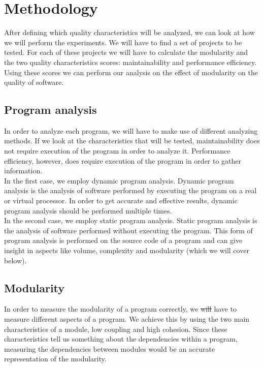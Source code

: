 \documentclass[twoside]{uva-inf-bachelor-thesis}
\begin{document}
\section{Methodology}
After defining which quality characteristics will be analyzed, we can look at how we will perform the experiments. We will have to find a set of projects to be tested. For each of these projects we will have to calculate the modularity and the two quality characteristics scores: maintainability and performance efficiency. Using these scores we can perform our analysis on the effect of modularity on the quality of software.

\subsection{Program analysis}
\label{method:analysis}
In order to analyze each program, we will have to make use of different analyzing methods. If we look at the characteristics that will be tested, maintainability does not require execution of the program in order to analyze it. Performance efficiency, however, does require execution of the program in order to gather information.\\

In the first case, we employ dynamic program analysis\cite{nielson2015principles}.
Dynamic program analysis is the analysis of software performed by executing the program on a real or virtual processor. In order to get accurate and effective results, dynamic program analysis should be performed multiple times.\\

In the second case, we employ static program analysis\cite{nielson2015principles}.
Static program analysis is the analysis of software performed without executing the program. This form of program analysis is performed on the source code of a program and can give insight in aspects like volume, complexity and modularity (which we will cover below).

\subsection{Modularity}
In order to measure the modularity of a program correctly, we \sout{will} have to measure different aspects of a program. We achieve this by using the two main characteristics of a module, low coupling and high cohesion. Since these characteristics tell us something about the dependencies within a program, measuring the dependencies between modules would be an accurate representation of the modularity.  
\end{document}
